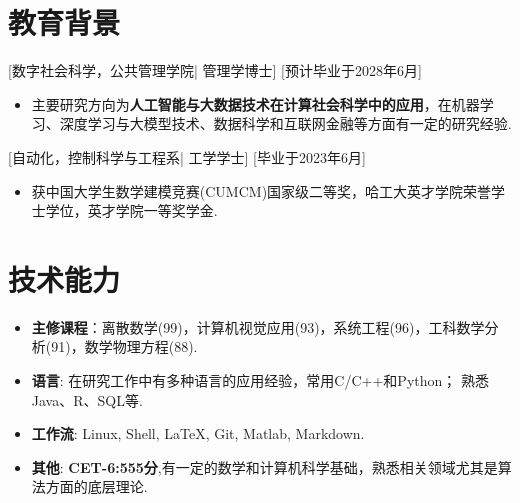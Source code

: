 \documentclass{resume}
\begin{document}



\ResumeTitle

\vspace{0.5cm}
\section{\textbf{教育背景}}
[\textnormal{数字社会科学，公共管理学院|} 管理学博士]
[预计毕业于2028年6月]
\begin{itemize}
    \item 主要研究方向为\textbf{人工智能与大数据技术在计算社会科学中的应用}，在机器学习、深度学习与大模型技术、数据科学和互联网金融等方面有一定的研究经验.
\end{itemize}

[\textnormal{自动化，控制科学与工程系|} 工学学士]
[毕业于2023年6月]
\begin{itemize}
    \item 获中国大学生数学建模竞赛(CUMCM)国家级二等奖，哈工大英才学院荣誉学士学位，英才学院一等奖学金.
\end{itemize}


\section[技术能力]{\textbf{技术能力}}
\begin{itemize}
\item \textbf{主修课程}：离散数学(99)，计算机视觉应用(93)，系统工程(96)，工科数学分析(91)，数学物理方程(88).
  \item \textbf{语言}: 在研究工作中有多种语言的应用经验，常用C/C++和Python； 熟悉 Java、R、SQL等.
  \item \textbf{工作流}: Linux, Shell, LaTeX, Git, Matlab, Markdown.
  \item \textbf{其他}: \textbf{CET-6:555分},有一定的数学和计算机科学基础，熟悉相关领域尤其是算法方面的底层理论.
\end{itemize}
\end{document}
